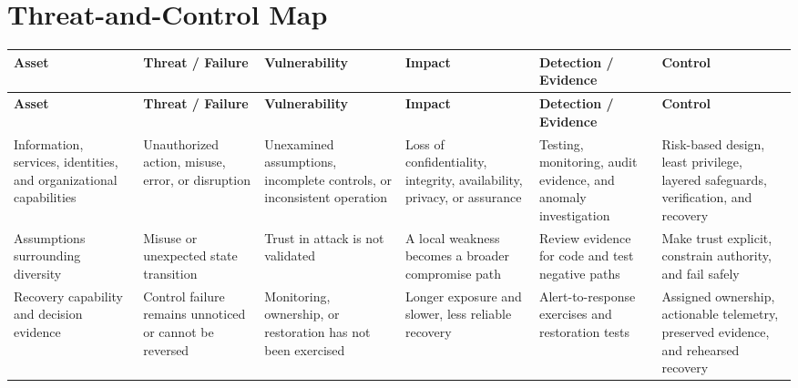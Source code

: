 \documentclass[11pt]{article}
\begin{document}
\section*{Threat-and-Control Map}
\begingroup\scriptsize\setlength{\tabcolsep}{2pt}
\begin{longtable}{>{\RaggedRight\arraybackslash}p{}>{\RaggedRight\arraybackslash}p{}>{\RaggedRight\arraybackslash}p{}>{\RaggedRight\arraybackslash}p{}>{\RaggedRight\arraybackslash}p{}>{\RaggedRight\arraybackslash}p{}}
\toprule\rowcolor{Navy}\color{white}\textbf{Asset} & \color{white}\textbf{Threat / Failure} & \color{white}\textbf{Vulnerability} & \color{white}\textbf{Impact} & \color{white}\textbf{Detection / Evidence} & \color{white}\textbf{Control}\\\midrule
\endfirsthead
\toprule\rowcolor{Navy}\color{white}\textbf{Asset} & \color{white}\textbf{Threat / Failure} & \color{white}\textbf{Vulnerability} & \color{white}\textbf{Impact} & \color{white}\textbf{Detection / Evidence} & \color{white}\textbf{Control}\\\midrule
\endhead
Information, services, identities, and organizational capabilities & Unauthorized action, misuse, error, or disruption & Unexamined assumptions, incomplete controls, or inconsistent operation & Loss of confidentiality, integrity, availability, privacy, or assurance & Testing, monitoring, audit evidence, and anomaly investigation & Risk-based design, least privilege, layered safeguards, verification, and recovery\\\midrule
Assumptions surrounding diversity & Misuse or unexpected state transition & Trust in attack is not validated & A local weakness becomes a broader compromise path & Review evidence for code and test negative paths & Make trust explicit, constrain authority, and fail safely\\\midrule
Recovery capability and decision evidence & Control failure remains unnoticed or cannot be reversed & Monitoring, ownership, or restoration has not been exercised & Longer exposure and slower, less reliable recovery & Alert-to-response exercises and restoration tests & Assigned ownership, actionable telemetry, preserved evidence, and rehearsed recovery\\\midrule
\bottomrule
\end{longtable}
\endgroup
\end{document}
